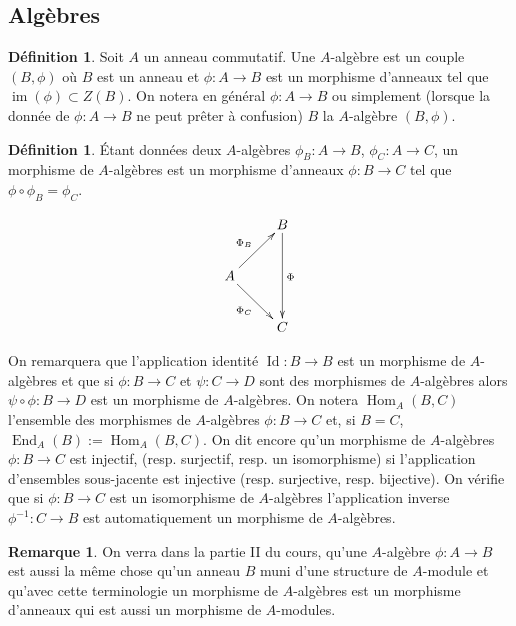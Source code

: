 \documentclass[a4paper, oneside, 12pt]{book}
\theoremstyle{theoremeStyle} %
\theoremstyle{definition} %
\newtheorem{definition}[theoreme]{Définition}
\newtheorem{remarque}[theoreme]{Remarque}
\DeclareMathOperator{\SEnd}{End}
\DeclareMathOperator{\SHom}{Hom}
\DeclareMathOperator{\im}{im}
\DeclareMathOperator{\Id}{Id}
\begin{document}
\subsection{Algèbres}

\begin{definition}Soit $A$ un anneau commutatif. Une $A$-algèbre est un couple $(B,\phi)$ où $B$ est  un anneau et  $\phi:A\rightarrow B$ est un morphisme d'anneaux tel que $\im(\phi)\subset Z(B)$.   On notera en général $\phi:A\rightarrow B$ ou simplement  (lorsque la donnée de $\phi:A\rightarrow B$ ne peut prêter à confusion) $B$  la $A$-algèbre $(B,\phi)$.\end{definition}
\begin{definition}
Étant données deux $A$-algèbres $\phi_B:A\rightarrow B$, $\phi_C:A\rightarrow C$, un morphisme de $A$-algèbres est un morphisme d'anneaux $\phi:B\rightarrow C$ tel que $\phi\circ \phi_B=\phi_C$.\end{definition}

$$ \xymatrix{ & B \ar[dd]^\Phi \\ A \ar[ru]^{\Phi_B} \ar[rd]_{\Phi_C} \\ & C } $$


On remarquera que l'application identité $\Id:B\rightarrow B$ est un morphisme de $A$-algèbres et que si $\phi:B\rightarrow C$ et $\psi:C\rightarrow D$ sont des morphismes de $A$-algèbres alors $\psi\circ \phi:B\rightarrow D$ est un morphisme de $A$-algèbres. On notera $\SHom_A(B,C)$ l'ensemble des morphismes de $A$-algèbres $\phi:B\rightarrow C$ et, si $B=C$, $\SEnd_A(B):=\SHom_A(B,C)$. On dit encore qu'un morphisme de $A$-algèbres $\phi:B\rightarrow C$ est injectif, (resp. surjectif, resp. un isomorphisme) si l'application d'ensembles sous-jacente est  injective (resp. surjective, resp. bijective). On vérifie que si $\phi:B\rightarrow C$ est un isomorphisme de $A$-algèbres l'application inverse $\phi^{-1}:C\rightarrow B$ est automatiquement un morphisme de $A$-algèbres.\\


\begin{remarque}On verra dans la partie II du cours, qu'une $A$-algèbre $\phi:A\rightarrow B$ est aussi la même chose qu'un anneau $B$ muni d'une structure de $A$-module  et qu'avec cette terminologie un morphisme de $A$-algèbres est un morphisme d'anneaux qui est aussi un morphisme de $A$-modules. \end{remarque}
\end{document}
